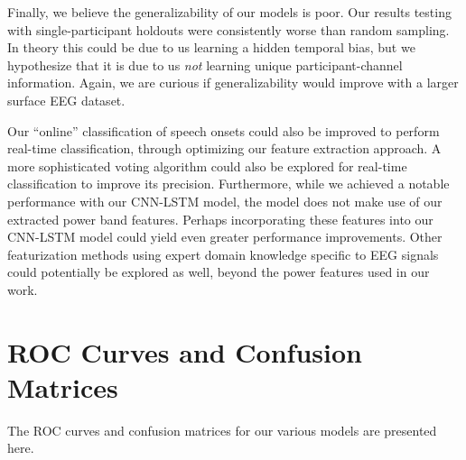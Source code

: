 \documentclass[format=sigconf, nonacm=true, review=false, screen=true]{acmart}
\begin{document}
Finally, we believe the generalizability of our models is poor. Our results testing with single-participant holdouts were consistently worse than random sampling. In theory this could be due to us learning a hidden temporal bias, but we hypothesize that it is due to us \textit{not} learning unique participant-channel information. Again, we are curious if generalizability would improve with a larger surface EEG dataset.

Our ``online'' classification of speech onsets could also be improved to perform real-time classification, through optimizing our feature extraction approach. A more sophisticated voting algorithm could also be explored for real-time classification to improve its precision. Furthermore, while we achieved a notable performance with our CNN-LSTM model, the model does not make use of our extracted power band features. Perhaps incorporating these features into our CNN-LSTM model could yield even greater performance improvements. Other featurization methods using expert domain knowledge specific to EEG signals could potentially be explored as well, beyond the power features used in our work. 




\newpage



\newpage
\onecolumn
\appendix
\section{ROC Curves and Confusion Matrices} \label{App:ROC_Curves}
The ROC curves and confusion matrices for our various models are presented here.

\renewcommand{\thefigure}{A.\arabic{figure}}
\setcounter{figure}{0}
\end{document}
